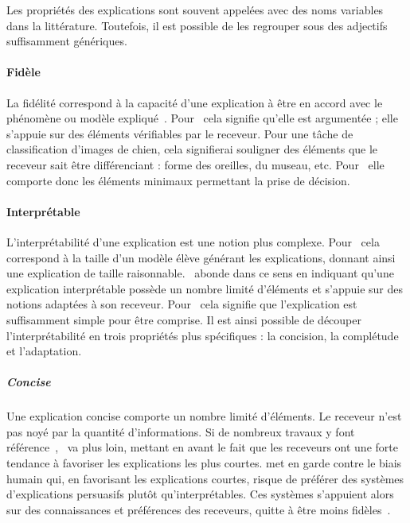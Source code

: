 Les propriétés des explications sont souvent appelées avec des noms variables dans la littérature. Toutefois, il est possible de les regrouper sous des adjectifs suffisamment génériques.

\paragraph{Fidèle}
La fidélité correspond à la capacité d'une explication à être en accord avec le phénomène ou modèle expliqué~\cite{Guidotti2018,Lundberg2017,Lakkaraju2019,Ribeiro2018,Hoffman2018,Liu2021,Ciravegna2020}.
Pour~\cite{Codella2019} cela signifie qu'elle est argumentée ; elle s'appuie sur des éléments vérifiables par le receveur. Pour une tâche de classification d'images de chien, cela signifierai souligner des éléments que le receveur sait être différenciant : forme des oreilles, du museau, etc. Pour~\cite{Petsiuk2018, DeYoung2019} elle comporte donc les éléments minimaux permettant la prise de décision.

\paragraph{Interprétable}
L'interprétabilité d'une explication est une notion plus complexe. Pour~\cite{Guidotti2018,Virgolin2021,Lakkaraju2019} cela correspond à la taille d'un modèle élève générant les explications, donnant ainsi une explication de taille raisonnable.~\cite{Ribeiro2016} abonde dans ce sens en indiquant qu'une explication interprétable possède un nombre limité d'éléments et s'appuie sur des notions adaptées à son receveur. Pour~\cite{Gilpin2018} cela signifie que l'explication est suffisamment simple pour être comprise. Il est ainsi possible de découper l'interprétabilité en trois propriétés plus spécifiques : la concision, la complétude et l'adaptation.

\subparagraph{Concise}
Une explication concise comporte un nombre limité d'éléments. Le receveur n'est pas noyé par la quantité d'informations. Si de nombreux travaux y font référence~\cite{Ribeiro2016,Petsiuk2018, Poppi2021,Lakkaraju2019,Zafar2021a},~\cite{Miller2017} va plus loin, mettant en avant le fait que les receveurs ont une forte tendance à favoriser les explications les plus courtes.
\cite{Gilpin2018} met en garde contre le biais humain qui, en favorisant les explications courtes, risque de préférer des systèmes d'explications persuasifs plutôt qu'interprétables. Ces systèmes s'appuient alors sur des connaissances et préférences des receveurs, quitte à être moins fidèles~\cite{Herman2017}.

